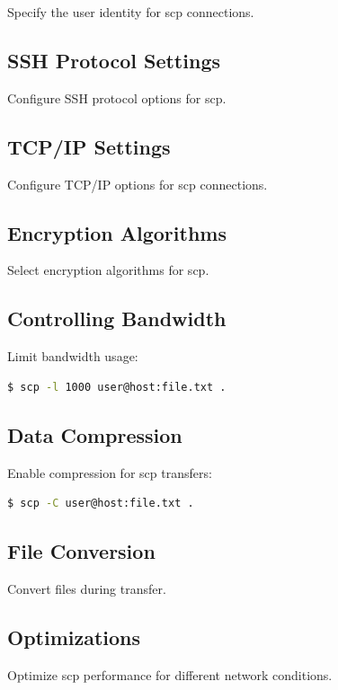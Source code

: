 \documentclass[12pt]{book}
\begin{document}
Specify the user identity for scp connections.

\subsection{SSH Protocol Settings}

Configure SSH protocol options for scp.

\subsection{TCP/IP Settings}

Configure TCP/IP options for scp connections.

\subsection{Encryption Algorithms}

Select encryption algorithms for scp.

\subsection{Controlling Bandwidth}

Limit bandwidth usage:

\begin{lstlisting}[language=bash]
$ scp -l 1000 user@host:file.txt .
\end{lstlisting}

\subsection{Data Compression}

Enable compression for scp transfers:

\begin{lstlisting}[language=bash]
$ scp -C user@host:file.txt .
\end{lstlisting}

\subsection{File Conversion}

Convert files during transfer.

\subsection{Optimizations}

Optimize scp performance for different network conditions.
\end{document}
